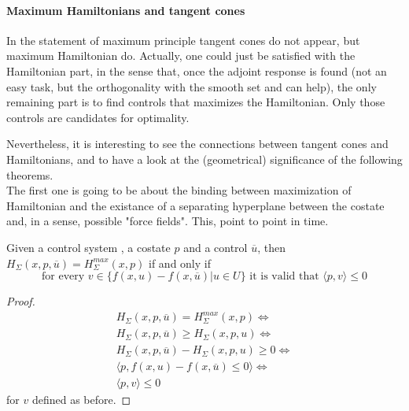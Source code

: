 \paragraph[5.12-5.14]{Maximum Hamiltonians and tangent cones}
In the statement of maximum principle tangent cones do not appear, but maximum Hamiltonian do. Actually, one could just be satisfied with the Hamiltonian part, in the sense that, once the adjoint response is found (not an easy task, but the orthogonality with the smooth set \so\space and \sz\space can help), the only remaining part is to find controls that maximizes the Hamiltonian. Only those controls are candidates for optimality. 

Nevertheless, it is interesting to see the connections between tangent cones and Hamiltonians, and to have a look at the (geometrical) significance of the following theorems.\\
The first one is going to be about the binding between maximization of Hamiltonian and the existance of a separating hyperplane between the costate and, in a sense, possible "force fields". This, point to point in time. 

\begin{teo}
Given a control system \controlSystem, a costate $p$ and a control $\overline{u}$, then\\
$H_\Sigma(x,p,\overline{u})=H_{\Sigma}^{max}(x,p)$ if and only if 
\[ \text{for every }v\in\{f(x,u)-f(x,\overline{u})|u\in U \}\text{ it is valid that }\langle p,v \rangle\le0 \]
\label{T8}
\label{5-12}
\end{teo}

\begin{proof}
	\begin{gather*}
	H_\Sigma(x,p,\overline{u})=H_{\Sigma}^{max}(x,p) \iff\\
	H_\Sigma(x,p,\overline{u})\ge H_\Sigma(x,p,u) \iff \\
	H_\Sigma(x,p,\overline{u})- H_\Sigma(x,p,u) \ge0 \iff\\
	\langle p,f(x,u)-f(x,\overline{u}) \le 0\rangle \iff\\
	\langle p,v \rangle \leq 0
\end{gather*}
for $v$ defined as before.
\end{proof}


